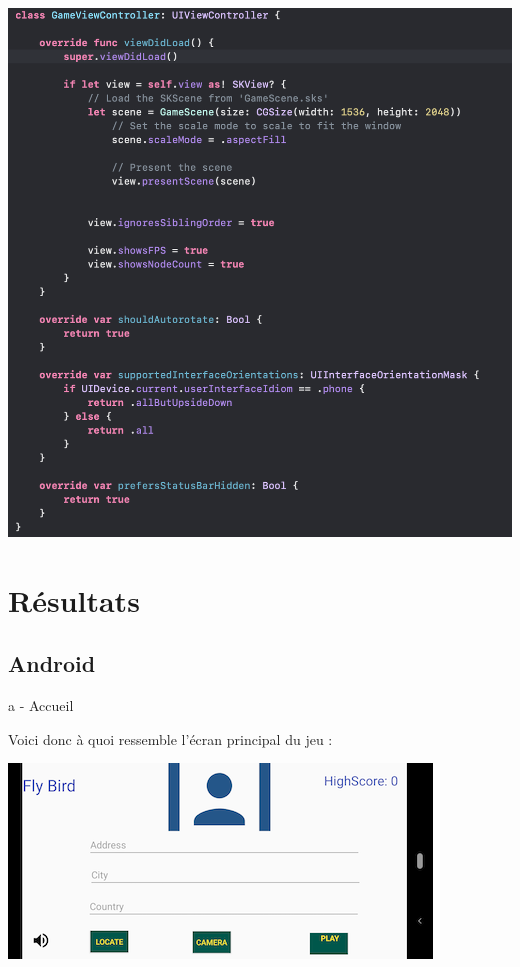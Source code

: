 \documentclass{rapportECL}
\begin{document}
 \begin{center}
    \includegraphics[scale = 0.5]{logos/GameViewController.png}
\end{center}

\newpage
\section{Résultats}
\subsection{Android}
a - Accueil

Voici donc à quoi ressemble l'écran principal du jeu : 

\begin{center}
    \includegraphics[scale = 0.5]{logos/accueil.png}
\end{center}
\end{document}
